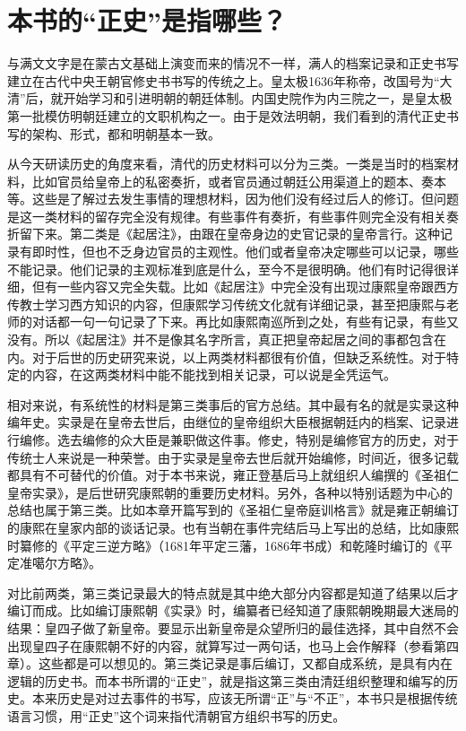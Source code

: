 \section{本书的“正史”是指哪些？}


与满文文字是在蒙古文基础上演变而来的情况不一样，满人的档案记录和正史书写建立在古代中央王朝官修史书书写的传统之上。皇太极1636年称帝，改国号为“大清”后，就开始学习和引进明朝的朝廷体制。内国史院作为内三院之一，是皇太极第一批模仿明朝廷建立的文职机构之一。由于是效法明朝，我们看到的清代正史书写的架构、形式，都和明朝基本一致。



从今天研读历史的角度来看，清代的历史材料可以分为三类。一类是当时的档案材料，比如官员给皇帝上的私密奏折，或者官员通过朝廷公用渠道上的题本、奏本等。这些是了解过去发生事情的理想材料，因为他们没有经过后人的修订。但问题是这一类材料的留存完全没有规律。有些事件有奏折，有些事件则完全没有相关奏折留下来。第二类是《起居注》，由跟在皇帝身边的史官记录的皇帝言行。这种记录有即时性，但也不乏身边官员的主观性。他们或者皇帝决定哪些可以记录，哪些不能记录。他们记录的主观标准到底是什么，至今不是很明确。他们有时记得很详细，但有一些内容又完全失载。比如《起居注》中完全没有出现过康熙皇帝跟西方传教士学习西方知识的内容，但康熙学习传统文化就有详细记录，甚至把康熙与老师的对话都一句一句记录了下来。再比如康熙南巡所到之处，有些有记录，有些又没有。所以《起居注》并不是像其名字所言，真正把皇帝起居之间的事都包含在内。对于后世的历史研究来说，以上两类材料都很有价值，但缺乏系统性。对于特定的内容，在这两类材料中能不能找到相关记录，可以说是全凭运气。



相对来说，有系统性的材料是第三类事后的官方总结。其中最有名的就是实录这种编年史。实录是在皇帝去世后，由继位的皇帝组织大臣根据朝廷内的档案、记录进行编修。选去编修的众大臣是兼职做这件事。修史，特别是编修官方的历史，对于传统士人来说是一种荣誉。由于实录是皇帝去世后就开始编修，时间近，很多记载都具有不可替代的价值。对于本书来说，雍正登基后马上就组织人编撰的《圣祖仁皇帝实录》，是后世研究康熙朝的重要历史材料。另外，各种以特别话题为中心的总结也属于第三类。比如本章开篇写到的《圣祖仁皇帝庭训格言》就是雍正朝编订的康熙在皇家内部的谈话记录。也有当朝在事件完结后马上写出的总结，比如康熙时纂修的《平定三逆方略》（1681年平定三藩，1686年书成）和乾隆时编订的《平定准噶尔方略》。



对比前两类，第三类记录最大的特点就是其中绝大部分内容都是知道了结果以后才编订而成。比如编订康熙朝《实录》时，编纂者已经知道了康熙朝晚期最大迷局的结果：皇四子做了新皇帝。要显示出新皇帝是众望所归的最佳选择，其中自然不会出现皇四子在康熙朝不好的内容，就算写过一两句话，也马上会作解释（参看第四章）。这些都是可以想见的。第三类记录是事后编订，又都自成系统，是具有内在逻辑的历史书。而本书所谓的“正史”，就是指这第三类由清廷组织整理和编写的历史。本来历史是对过去事件的书写，应该无所谓“正”与“不正”，本书只是根据传统语言习惯，用“正史”这个词来指代清朝官方组织书写的历史。


